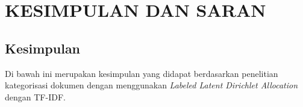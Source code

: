 \chapter{KESIMPULAN DAN SARAN}

\vspace{4.5pt}

\section{Kesimpulan}
\indent
Di bawah ini merupakan kesimpulan yang didapat berdasarkan penelitian kategorisasi dokumen dengan menggunakan {\itshape Labeled Latent Dirichlet Allocation} dengan TF-IDF.

